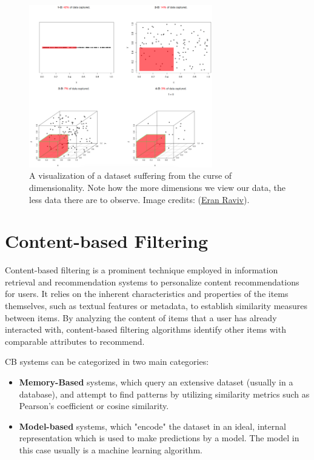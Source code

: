 \documentclass[12pt, a4paper]{article}
\begin{document}
\begin{figure}
    \centering
    \includegraphics[width=8cm]{resources/COD.png}
    \caption{A visualization of a dataset suffering from the curse of dimensionality. Note how the more dimensions we view our data, the less data there are to observe. Image credits: (\href{https://eranraviv.com/curse-of-dimensionality/}{Eran Raviv}).}
    \label{fig:cod}
\end{figure}


\section{Content-based Filtering}

Content-based filtering is a prominent technique employed in information retrieval and recommendation systems to personalize content recommendations for users. It relies on the inherent characteristics and properties of the items themselves, such as textual features or metadata, to establish similarity measures between items. By analyzing the content of items that a user has already interacted with, content-based filtering algorithms identify other items with comparable attributes to recommend. 

CB systems can be categorized in two main categories:
\begin{itemize}
    \item \textbf{Memory-Based} systems, which query an extensive dataset (usually in a database), and attempt to find patterns by utilizing similarity metrics such as Pearson's coefficient or cosine similarity.

    \item \textbf{Model-based} systems, which "encode" the dataset in an ideal, internal representation which is used to make predictions by a model. The model in this case usually is a machine learning algorithm.
\end{itemize}
\end{document}

